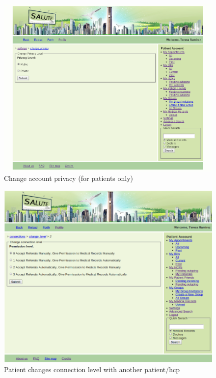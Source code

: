\begin{figure}
\includegraphics[scale=0.5]{screenshots/change_privacy.png}
\caption{Change account privacy (for patients only)}
\end{figure}

\begin{figure}
\includegraphics[scale=0.5]{screenshots/change_connection_level.png}
\caption{Patient changes connection level with another patient/hcp}
\end{figure}

